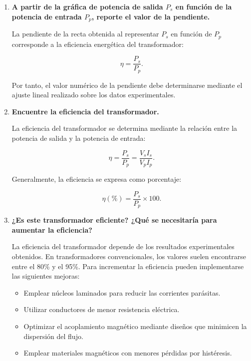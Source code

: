 \begin{enumerate}
\item \textbf{A partir de la gráfica de potencia de salida $P_s$ en función de la potencia de entrada $P_p$, reporte el valor de la pendiente.}

La pendiente de la recta obtenida al representar $P_s$ en función de $P_p$ corresponde a la eficiencia energética del transformador:

\begin{equation}
\eta=\frac{P_s}{P_p}.
\end{equation}

Por tanto, el valor numérico de la pendiente debe determinarse mediante el ajuste lineal realizado sobre los datos experimentales.

\item \textbf{Encuentre la eficiencia del transformador.}

La eficiencia del transformador se determina mediante la relación entre la potencia de salida y la potencia de entrada:

\begin{equation}
\eta=\frac{P_s}{P_p}
=\frac{V_sI_s}{V_pI_p}.
\end{equation}

Generalmente, la eficiencia se expresa como porcentaje:

\begin{equation}
\eta(\%)=
\frac{P_s}{P_p}\times100.
\end{equation}

\item \textbf{¿Es este transformador eficiente? ¿Qué se necesitaría para aumentar la eficiencia?}

La eficiencia del transformador depende de los resultados experimentales obtenidos. En transformadores convencionales, los valores suelen encontrarse entre el 80\% y el 95\%. Para incrementar la eficiencia pueden implementarse las siguientes mejoras:

\begin{itemize}
    \item Emplear núcleos laminados para reducir las corrientes parásitas.
    \item Utilizar conductores de menor resistencia eléctrica.
    \item Optimizar el acoplamiento magnético mediante diseños que minimicen la dispersión del flujo.
    \item Emplear materiales magnéticos con menores pérdidas por histéresis.
\end{itemize}

\end{enumerate}
